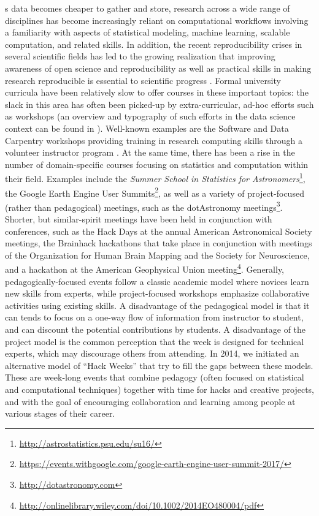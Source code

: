 \label{sec:introduction}
s data becomes cheaper to gather and store, research across a wide range of disciplines has become increasingly reliant on computational workflows involving a familiarity with aspects of statistical modeling, machine learning, scalable computation, and related skills. In addition, the recent reproducibility crises in several scientific fields has led to the growing realization that improving awareness of open science and reproducibility as well as practical skills in making research reproducible is essential to scientific progress \cite[e.g.][]{pashler2012,frye2015,gezelter2015,baker2016}.
Formal university curricula have been relatively slow to offer courses in these important topics: the slack in this area has often been picked-up by extra-curricular, ad-hoc efforts such as workshops (an overview and typography of such efforts in the data science context can be found in \cite{demasi2017}).
Well-known examples are the Software and Data Carpentry workshops providing training in research computing skills through a volunteer instructor program  \cite{b:wilson-swc-lessons-2016,teal2015data}.
At the same time, there has been a rise in the number of domain-specific courses focusing on statistics and computation within their field.
Examples include the \textit{Summer School in Statistics for Astronomers}\footnote{\url{http://astrostatistics.psu.edu/su16/}}, the Google Earth Engine User Summits\footnote{\url{https://events.withgoogle.com/google-earth-engine-user-summit-2017/}}, as well as a variety of project-focused (rather than pedagogical) meetings, such as the dotAstronomy meetings\footnote{\url{http://dotastronomy.com}}.
Shorter, but similar-spirit meetings have been held in conjunction with conferences, such as the Hack Days at the annual American Astronomical Society meetings, the Brainhack hackathons that take place in conjunction with meetings of the Organization for Human Brain Mapping and the Society for Neuroscience\cite{Cameron_Craddock2016-wc}, and a hackathon at the American Geophysical Union meeting\footnote{\url{http://onlinelibrary.wiley.com/doi/10.1002/2014EO480004/pdf}}.
Generally, pedagogically-focused events follow a classic academic model where novices learn new skills from experts, while project-focused workshops emphasize collaborative activities using existing skills.
A disadvantage of the pedagogical model is that it can tends to focus on a one-way flow of information from instructor to student, and can discount the potential contributions by students.
A disadvantage of the project model is the common perception that the week is designed for technical experts, which may discourage others from attending.
In 2014, we initiated an alternative model of ``Hack Weeks'' that try to fill the gaps between these models.
These are week-long events that combine pedagogy (often focused on statistical and computational techniques) together with time for hacks and creative projects, and with the goal of encouraging collaboration and learning among people at various stages of their career.

